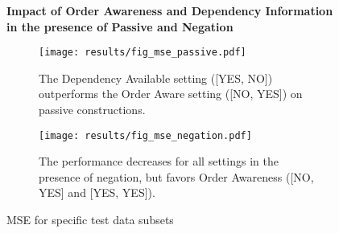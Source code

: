 \begin{figure}[htb!]
	\centering
	\textbf{Impact of Order Awareness and Dependency Information \\ in the presence of Passive and Negation}\par\medskip
	\begin{subfigure}[t]{.5\textwidth}
		\texttt{[image: results/fig\_mse\_passive.pdf]}
		\captionsetup{width=0.9\linewidth}
		\caption{The Dependency Available setting ([YES, NO]) outperforms the Order Aware setting ([NO, YES]) on passive constructions.}
		\label{fig:fig_mse_passive}
	\end{subfigure}%
	\begin{subfigure}[t]{.5\textwidth}
		\texttt{[image: results/fig\_mse\_negation.pdf]}
		\captionsetup{width=0.9\linewidth}
		\caption{The performance decreases for all settings in the presence of negation, but favors Order Awareness ([NO, YES] and [YES, YES]).}
		\label{fig:fig_mse_negation}
	\end{subfigure}	
	\caption{MSE for specific test data subsets}
\end{figure}


\fi
